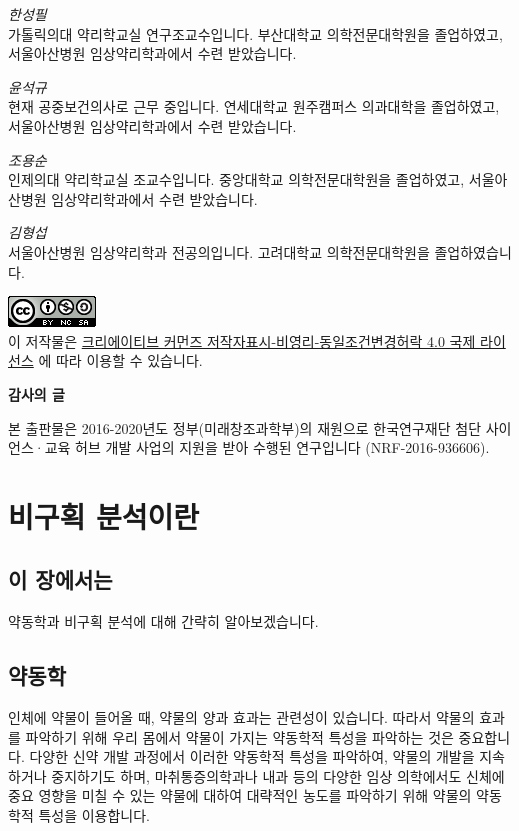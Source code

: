 \documentclass[
  12pt,
]{krantz}
\begin{document}
\emph{한성필}\\
가톨릭의대 약리학교실 연구조교수입니다. 부산대학교 의학전문대학원을 졸업하였고, 서울아산병원 임상약리학과에서 수련 받았습니다.

\emph{윤석규}\\
현재 공중보건의사로 근무 중입니다. 연세대학교 원주캠퍼스 의과대학을 졸업하였고, 서울아산병원 임상약리학과에서 수련 받았습니다.

\emph{조용순}\\
인제의대 약리학교실 조교수입니다. 중앙대학교 의학전문대학원을 졸업하였고, 서울아산병원 임상약리학과에서 수련 받았습니다.

\emph{김형섭}\\
서울아산병원 임상약리학과 전공의입니다. 고려대학교 의학전문대학원을 졸업하였습니다.

\includegraphics{assets/cc.png}\\
이 저작물은 \href{http://creativecommons.org/licenses/by-nc-sa/4.0/}{크리에이티브 커먼즈 저작자표시-비영리-동일조건변경허락 4.0 국제 라이선스} 에 따라 이용할 수 있습니다.

\textbf{감사의 글}

본 출판물은 2016-2020년도 정부(미래창조과학부)의 재원으로 한국연구재단 첨단 사이언스·교육 허브 개발 사업의 지원을 받아 수행된 연구입니다 (NRF-2016-936606).

\mainmatter

\hypertarget{introduction}{%
\chapter{비구획 분석이란}\label{introduction}}

\hypertarget{summary-introduction}{%
\section{이 장에서는}\label{summary-introduction}}

약동학과 비구획 분석에 대해 간략히 알아보겠습니다.

\hypertarget{PK-introduction}{%
\section{약동학}\label{PK-introduction}}

인체에 약물이 들어올 때, 약물의 양과 효과는 관련성이 있습니다.
따라서 약물의 효과를 파악하기 위해 우리 몸에서 약물이 가지는 약동학적 특성을 파악하는 것은 중요합니다.
다양한 신약 개발 과정에서 이러한 약동학적 특성을 파악하여, 약물의 개발을 지속하거나 중지하기도 하며, 마취통증의학과나 내과 등의 다양한 임상 의학에서도 신체에 중요 영향을 미칠 수 있는 약물에 대하여 대략적인 농도를 파악하기 위해 약물의 약동학적 특성을 이용합니다.
\end{document}
